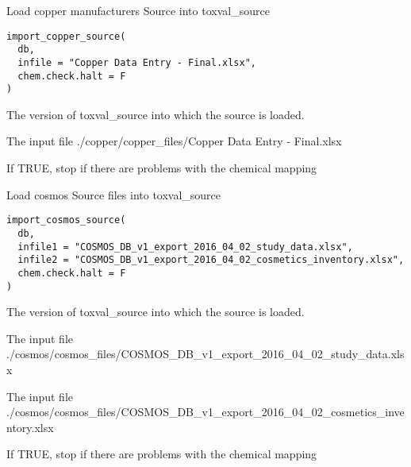 \documentclass[letterpaper]{book}
\begin{document}
%
\begin{Description}\relax
Load copper manufacturers Source into toxval\_source
\end{Description}
%
\begin{Usage}
\begin{verbatim}
import_copper_source(
  db,
  infile = "Copper Data Entry - Final.xlsx",
  chem.check.halt = F
)
\end{verbatim}
\end{Usage}
%
\begin{Arguments}
\begin{ldescription}
\item[\code{db}] The version of toxval\_source into which the source is loaded.

\item[\code{infile}] The input file ./copper/copper\_files/Copper Data Entry - Final.xlsx

\item[\code{chem.check.halt}] If TRUE, stop if there are problems with the chemical mapping
\end{ldescription}
\end{Arguments}
%
\begin{Description}\relax
Load cosmos Source files into toxval\_source
\end{Description}
%
\begin{Usage}
\begin{verbatim}
import_cosmos_source(
  db,
  infile1 = "COSMOS_DB_v1_export_2016_04_02_study_data.xlsx",
  infile2 = "COSMOS_DB_v1_export_2016_04_02_cosmetics_inventory.xlsx",
  chem.check.halt = F
)
\end{verbatim}
\end{Usage}
%
\begin{Arguments}
\begin{ldescription}
\item[\code{db}] The version of toxval\_source into which the source is loaded.

\item[\code{infile1}] The input file ./cosmos/cosmos\_files/COSMOS\_DB\_v1\_export\_2016\_04\_02\_study\_data.xlsx

\item[\code{infile2}] The input file ./cosmos/cosmos\_files/COSMOS\_DB\_v1\_export\_2016\_04\_02\_cosmetics\_inventory.xlsx

\item[\code{chem.check.halt}] If TRUE, stop if there are problems with the chemical mapping
\end{ldescription}
\end{Arguments}
\end{document}
